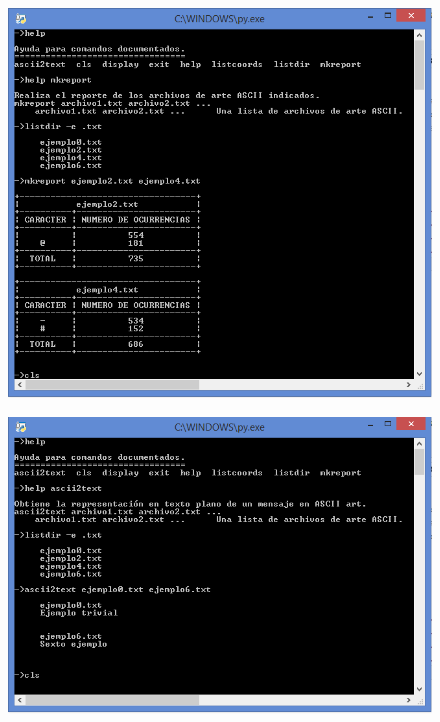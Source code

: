 \documentclass[a4paper,12pt]{article}
\begin{document}
\begin{figure}[htbp]
    \centering
    \begin{adjustbox}{max width=\textwidth, center}
        \includegraphics{C4/S3_C4.PNG}
    \end{adjustbox}
\end{figure}
\begin{figure}[htbp]
    \begin{adjustbox}{max width=\textwidth}
        \includegraphics{C4/S4_C4.PNG}
    \end{adjustbox}
\end{figure}
\end{document}
